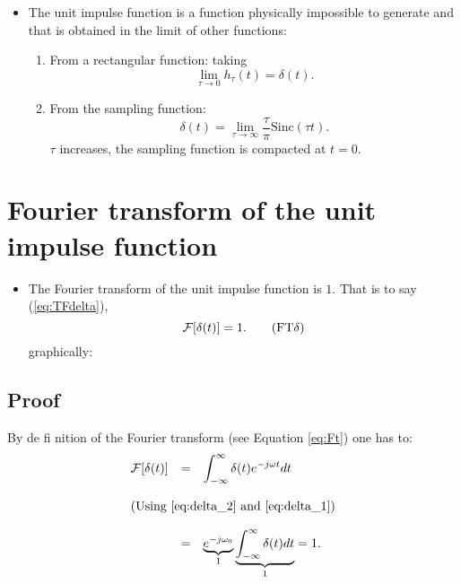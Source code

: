 \begin{itemize}
\item The unit impulse function is a function physically impossible to
  generate and that is obtained in the limit of other functions:
  \begin{enumerate}
  \item From a rectangular function:
    taking
    $$
    \lim_{\tau\rightarrow0}h_\tau(t) = \delta(t).
    $$
  \item From the sampling function:
    \begin{equation}
      \delta(t) =
      \lim_{\tau\rightarrow\infty}\frac{\tau}{\pi}\mathrm{Sinc}(\tau
      t).  \tag{delta\_sinc}
      \label{eq:delta_sinc}
    \end{equation}
    $\tau$ increases, the sampling function is compacted at $t=0$.
  \end{enumerate}
\end{itemize}

\section{Fourier transform of the unit impulse function}
\begin{itemize}
\item [] The Fourier transform of the unit impulse function is
  $1$. That is to say (\ref{eq:TFdelta}),
  \begin{equation}
    {\cal{F}}[\delta(t)]=1.
    \tag{FT$\delta$}
    \label{eq:TFdelta}
  \end{equation}
  graphically:
\end{itemize}

\subsection*{Proof}
By de fi nition of the Fourier transform (see Equation \ref{eq:Ft}) one has to:
\begin{equation*}
  \begin{array}{rcl}
    {\cal F}[\delta(t)] & = & \displaystyle\int_{-\infty}^\infty\delta(t)e^{-j\omega t}dt\\\\
    \multicolumn{3}{l}{\text{(Using \ref{eq:delta_2} and \ref{eq:delta_1})}}\\\\
    & = & \underbrace{e^{-j\omega_0}}_{1}\underbrace{\displaystyle\int_{-\infty}^\infty\delta(t)dt}_{1} = 1.
  \end{array}
\end{equation*}

